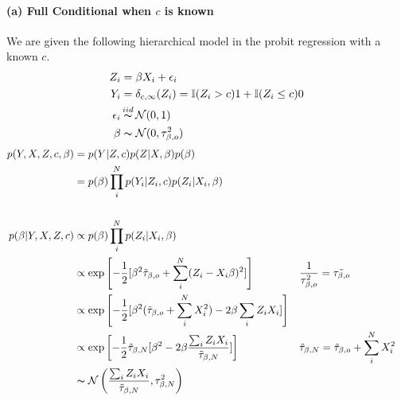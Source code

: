 \documentclass[11pt, letterpaper]{article}
\begin{document}
\paragraph{(a) Full Conditional when $c$ is known}
We are given the following hierarchical model in the probit regression with a known $c$.
\begin{align*}
    Z_i &= \beta X_i + \epsilon_i \\
    Y_i &= \delta_{c, \infty}(Z_i) = \mathbb{I}(Z_i>c) 1 + \mathbb{I}(Z_i\leq c) 0 \\
    \epsilon_i &\mathop{\thicksim}^{iid} \mathcal{N}(0, 1) \\
    \beta &\thicksim \mathcal{N}(0, \tau^2_{\beta, o})
\end{align*}
\begin{align*}
    p(Y, X, Z, c, \beta) &= p(Y|Z,c) p(Z|X,\beta) p(\beta) \\
        &= p(\beta) \prod_i^N p(Y_i|Z_i,c) p(Z_i|X_i, \beta) \\ \\
    p(\beta | Y, X, Z, c) &\propto p(\beta) \prod_i^N p(Z_i|X_i, \beta) \\
        &\propto \exp \left[ -\frac{1}{2} [
            \beta^2\tilde{\tau}_{\beta, o} + \sum_i^N(Z_i - X_i\beta)^2
        ]\right] && \frac{1}{\tau_{\beta, o}^2} = \tilde{\tau_{\beta, o}} \\
        &\propto \exp \left[ -\frac{1}{2} [
            \beta^2(\tilde{\tau}_{\beta, o} + \sum_i^N X_i^2) - 2\beta \sum_i Z_i X_i
        ] \right] \\
        &\propto \exp \left[ -\frac{1}{2} \tilde{\tau}_{\beta, N} [
            \beta^2 - 2\beta \frac{\sum_i Z_i X_i}{\tilde{\tau}_{\beta, N}}
        ] \right] && \tilde{\tau}_{\beta, N} = \tilde{\tau}_{\beta, o} + \sum_i^N X_i^2 \\
        &\thicksim \mathcal{N} \left( \frac{\sum_i Z_i X_i}{\tilde{\tau}_{\beta, N}}, \tau^2_{\beta, N} \right)
\end{align*}
\end{document}
